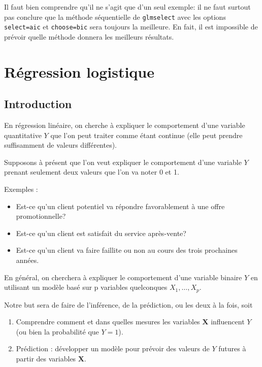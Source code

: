 \documentclass[
  11pt,
  letterpaper,
]{book}
\providecommand{\tightlist}{%
  \setlength{\itemsep}{0pt}\setlength{\parskip}{0pt}}
\theoremstyle{definition}
\theoremstyle{definition}
\theoremstyle{definition}
\theoremstyle{remark}
\begin{document}
Il faut bien comprendre qu'il ne s'agit que d'un seul exemple: il ne faut surtout pas conclure que la méthode séquentielle de \texttt{glmselect} avec les options \texttt{select=aic} et \texttt{choose=bic} sera toujours la meilleure. En fait, il est impossible de prévoir quelle méthode donnera les meilleurs résultats.

\hypertarget{regression-logistique}{%
\chapter{Régression logistique}\label{regression-logistique}}

\hypertarget{introduction-4}{%
\section{Introduction}\label{introduction-4}}

En régression linéaire, on cherche à expliquer le comportement d'une variable quantitative \(Y\) que l'on peut traiter comme étant continue (elle peut prendre suffisamment de valeurs différentes).

Supposons à présent que l'on veut expliquer le comportement d'une variable \(Y\) prenant seulement deux valeurs que l'on va noter 0 et 1.

Exemples :

\begin{itemize}
\tightlist
\item
  Est-ce qu'un client potentiel va répondre favorablement à une offre promotionnelle?
\item
  Est-ce qu'un client est satisfait du service après-vente?
\item
  Est-ce qu'un client va faire faillite ou non au cours des trois prochaines années.
\end{itemize}

En général, on cherchera à expliquer le comportement d'une variable binaire \(Y\) en utilisant un modèle basé sur p variables quelconques \(X_1, \ldots, X_p\).

Notre but sera de faire de l'inférence, de la prédiction, ou les deux à la fois, soit

\begin{enumerate}
\def\labelenumi{\arabic{enumi})}
\tightlist
\item
  Comprendre comment et dans quelles mesures les variables \(\boldsymbol{X}\) influencent \(Y\) (ou bien la probabilité que \(Y=1\)).
\item
  Prédiction : développer un modèle pour prévoir des valeurs de \(Y\) futures à partir des variables \(\boldsymbol{X}\).
\end{enumerate}
\end{document}
